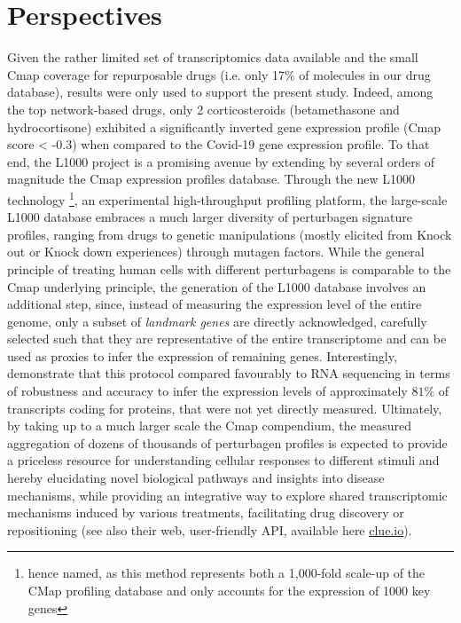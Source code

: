 \section{Perspectives}
\label{sec:perspectives-repositioning}
Given the rather limited set of transcriptomics data available and the small Cmap coverage for repurposable drugs (i.e. only 17$\%$ of molecules in our drug database), results were only used to support the present study. Indeed, among the top network-based drugs, only 2 corticosteroids (betamethasone and hydrocortisone) exhibited a significantly inverted gene expression profile (Cmap score < -0.3) when compared to the Covid-19 gene expression profile.
To that end, the L1000 project is a promising avenue by extending by several orders of magnitude the Cmap expression profiles database. Through the new L1000 technology \footnote{hence named, as this method represents both a 1,000-fold scale-up of the CMap profiling database and only accounts for the expression of \num{1000} key genes}, an experimental high-throughput profiling platform, the large-scale L1000 database embraces a much larger diversity of perturbagen signature profiles, ranging from drugs to genetic manipulations (mostly elicited from Knock out or Knock down experiences) through mutagen factors. While the general principle of treating human cells with different perturbagens is comparable to the Cmap underlying principle, the generation of the L1000 database involves an additional step, since, instead of measuring the expression level of the entire genome, only a subset of \emph{landmark genes} are directly acknowledged, carefully selected such that they are representative of the entire transcriptome and can be used as proxies to infer the expression of remaining genes. Interestingly, \autocite{subramanian_etal17} demonstrate that this protocol compared favourably to RNA sequencing in terms of robustness and accuracy to infer the expression levels of approximately $81\%$ of transcripts coding for proteins, that were not yet directly measured. Ultimately, by taking up to a much larger scale the Cmap compendium, the measured aggregation of dozens of thousands of perturbagen profiles is expected to provide a priceless resource for understanding cellular responses to different stimuli and hereby elucidating novel biological pathways and insights into disease mechanisms, while providing an integrative way to explore shared transcriptomic mechanisms  induced by various treatments, facilitating drug discovery or repositioning (see also their web, user-friendly API, available here \href{https://clue.io/}{clue.io}).


